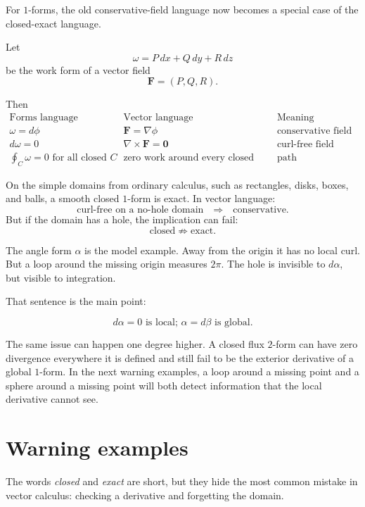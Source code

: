 For \(1\)-forms, the old conservative-field language now becomes a special case of the
closed-exact language.

Let
\[
    \omega=P\,dx+Q\,dy+R\,dz
\]
be the work form of a vector field
\[
    \mathbf F=(P,Q,R).
\]

Then
\[
\begin{array}{c|c|c}
\text{Forms language} & \text{Vector language} & \text{Meaning} \\ \hline
\omega=d\phi & \mathbf F=\nabla\phi &
\text{conservative field}\\[1mm]
d\omega=0 & \nabla\times\mathbf F=\mathbf 0 &
\text{curl-free field}\\[1mm]
\displaystyle \oint_C\omega=0\text{ for all closed }C
& \text{zero work around every closed loop}
& \text{path independence}
\end{array}
\]

On the simple domains from ordinary calculus, such as rectangles, disks, boxes, and
balls, a smooth closed \(1\)-form is exact.  In vector language:
\[
\boxed{
    \text{curl-free on a no-hole domain}
    \quad\Longrightarrow\quad
    \text{conservative.}
}
\]
But if the domain has a hole, the implication can fail:
\[
\boxed{
    \text{closed}
    \not\Longrightarrow
    \text{exact}.
}
\]

The angle form \(\alpha\) is the model example.  Away from the origin it has no local
curl.  But a loop around the missing origin measures \(2\pi\).  The hole is invisible to
\(d\alpha\), but visible to integration.

That sentence is the main point:

\[
\boxed{
    d\alpha=0 \text{ is local; } \alpha=d\beta \text{ is global.}
}
\]

The same issue can happen one degree higher.  A closed flux \(2\)-form can have zero
divergence everywhere it is defined and still fail to be the exterior derivative of a
global \(1\)-form.  In the next warning examples, a loop around a missing point and a
sphere around a missing point will both detect information that the local derivative
cannot see.

\section{Warning examples}
\label{sec:17.6}

The words \emph{closed} and \emph{exact} are short, but they hide the most common
mistake in vector calculus: checking a derivative and forgetting the domain.

